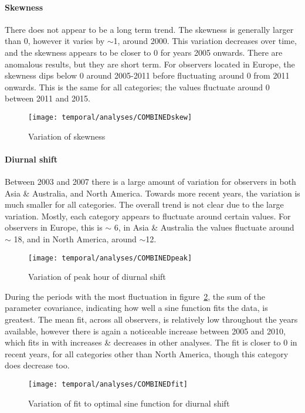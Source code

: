 \paragraph{Skewness\\}
There does not appear to be a long term trend. The skewness is generally larger than 0, however it varies by $\sim$1, around 2000. This variation decreases over time, and the skewness appears to be closer to 0 for years 2005 onwards. There are anomalous results, but they are short term. For observers located in Europe, the skewness dips below 0 around 2005-2011 before fluctuating around 0 from 2011 onwards. This is the same for all categories; the values fluctuate around 0 between 2011 and 2015.
\begin{figure}[h!]
	\centering
	\texttt{[image: temporal/analyses/COMBINEDskew]}
	\caption{Variation of skewness
		\label{fig:temp:skew}}
\end{figure}
\paragraph{Diurnal shift\\}
Between 2003 and 2007 there is a large amount of variation for observers in both Asia \& Australia, and North America. Towards more recent years, the variation is much smaller for all categories. The overall trend is not clear due to the large variation. Mostly, each category appears to fluctuate around certain values. For observers in Europe, this is $\sim$ 6, in Asia \& Australia the values fluctuate around $\sim$ 18, and in North America, around $\sim$12.
\begin{figure}[h!]
	\centering
	\texttt{[image: temporal/analyses/COMBINEDpeak]}
	\caption{Variation of peak hour of diurnal shift
		\label{fig:temp:peak}}
\end{figure}
During the periods with the most fluctuation in figure~\ref{fig:temp:peak}, the sum of the parameter covariance, indicating how well a sine function fits the data, is greatest. The mean fit, across all observers, is relatively low throughout the years available, however there is again a noticeable increase between 2005 and 2010, which fits in with increases \& decreases in other analyses. The fit is closer to 0 in recent years, for all categories other than North America, though this category does decrease too.
\begin{figure}[h!]
	\centering
	\texttt{[image: temporal/analyses/COMBINEDfit]}
	\caption{Variation of fit to optimal sine function for diurnal shift
		\label{fig:temp:fit}}
\end{figure}

